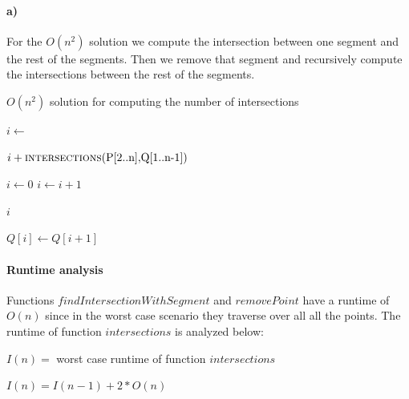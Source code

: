 \paragraph{a)} 
For the $O(n^2)$ solution we compute the intersection between one segment and the rest of the segments. Then we remove that segment and recursively compute the intersections between the rest of the segments.

\begin{algorithm}
	\caption{$O(n^2)$ solution for computing the number of intersections}
	\begin{algorithmic}
	  	\State $i \gets $  
		\State {} 
	
		\Return $i + \Call{intersections}{$P[2..n]$, $Q[1..n-1]$}$
	  \EndFunction
	
		\State $i \gets 0$
			\State $i \gets i + 1$
		\EndWhile
	
		\Return $i$
	  \EndFunction
	
			\State $Q[i] \gets Q[i + 1]$
		\EndFor
	  \EndFunction
	\end{algorithmic}
\end{algorithm}

\paragraph{Runtime analysis}
Functions $findIntersectionWithSegment$ and $removePoint$ have a runtime of $O(n)$ since in the worst case scenario they traverse over all all the points. The runtime of function $intersections$ is analyzed below:

\clearpage
$I(n) =$ worst case runtime of function $intersections$

$I(n) = I(n - 1) + 2 * O(n)$

